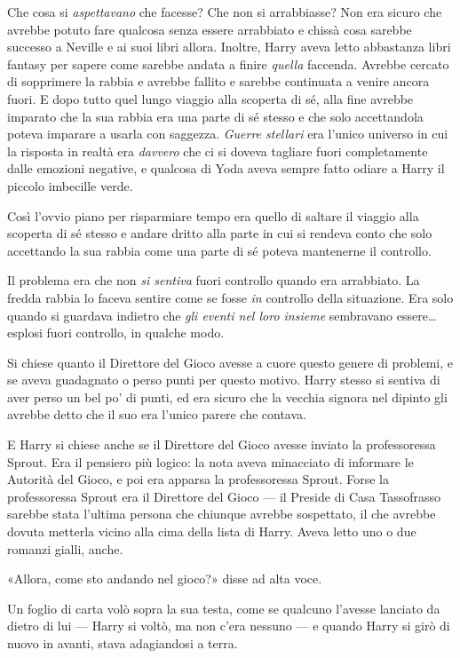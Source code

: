 Che cosa si \textit{aspettavano} che facesse? Che non si arrabbiasse? Non era sicuro che avrebbe potuto fare qualcosa senza essere arrabbiato e chissà cosa sarebbe successo a Neville e ai suoi libri allora. Inoltre, Harry aveva letto abbastanza libri fantasy per sapere come sarebbe andata a finire \textit{quella} faccenda. Avrebbe cercato di sopprimere la rabbia e avrebbe fallito e sarebbe continuata a venire ancora fuori. E dopo tutto quel lungo viaggio alla scoperta di sé, alla fine avrebbe imparato che la sua rabbia era una parte di sé stesso e che solo accettandola poteva imparare a usarla con saggezza. \textit{Guerre stellari} era l’unico universo in cui la risposta in realtà era \textit{davvero} che ci si doveva tagliare fuori completamente dalle emozioni negative, e qualcosa di Yoda aveva sempre fatto odiare a Harry il piccolo imbecille verde.

Così l’ovvio piano per risparmiare tempo era quello di saltare il viaggio alla scoperta di sé stesso e andare dritto alla parte in cui si rendeva conto che solo accettando la sua rabbia come una parte di sé poteva mantenerne il controllo.

Il problema era che non \textit{si sentiva} fuori controllo quando era arrabbiato. La fredda rabbia lo faceva sentire come se fosse \textit{in} controllo della situazione. Era solo quando si guardava indietro che \textit{gli eventi nel loro insieme} sembravano essere… esplosi fuori controllo, in qualche modo.

Si chiese quanto il Direttore del Gioco avesse a cuore questo genere di problemi, e se aveva guadagnato o perso punti per questo motivo. Harry stesso si sentiva di aver perso un bel po’ di punti, ed era sicuro che la vecchia signora nel dipinto gli avrebbe detto che il suo era l’unico parere che contava.

E Harry si chiese anche se il Direttore del Gioco avesse inviato la professoressa Sprout. Era il pensiero più logico: la nota aveva minacciato di informare le Autorità del Gioco, e poi era apparsa la professoressa Sprout. Forse la professoressa Sprout era il Direttore del Gioco — il Preside di Casa Tassofrasso sarebbe stata l’ultima persona che chiunque avrebbe sospettato, il che avrebbe dovuta metterla vicino alla cima della lista di Harry. Aveva letto uno o due romanzi gialli, anche.

«Allora, come sto andando nel gioco?» disse ad alta voce.

Un foglio di carta volò sopra la sua testa, come se qualcuno l’avesse lanciato da dietro di lui — Harry si voltò, ma non c’era nessuno — e quando Harry si girò di nuovo in avanti, stava adagiandosi a terra.

